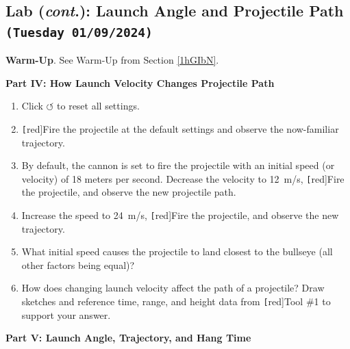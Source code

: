 \documentclass[main-physics.tex]{subfiles}
\begin{document}
\vspace{1em}

\subsection{Lab {\small (\textit{cont}.)}: Launch Angle and Projectile Path \texttt{(Tuesday 01/09/2024)}} \label{9UH4Uj}

\begin{mdframed}[backgroundcolor=csOrange]
    \textbf{Warm-Up}. See Warm-Up from Section \ref{1hGIbN}.
\end{mdframed}

\textbf{Part IV: How Launch Velocity Changes Projectile Path}

\begin{enumerate}
    \item Click $\boldsymbol{\circlearrowleft}$ to reset all settings.
    \item \texttt[red]{Fire} the projectile at the default settings and observe the now-familiar trajectory. 
    \item By default, the cannon is set to fire the projectile with an initial speed (or velocity) of 18 meters per second. Decrease the velocity to \SI{12}{m/s}, \texttt[red]{Fire} the projectile, and observe the new projectile path.
    \item Increase the speed to \SI{24}{m/s}, \texttt[red]{Fire} the projectile, and observe the new trajectory.
    \item What initial speed causes the projectile to land closest to the bullseye (all other factors being equal)?
    \item How does changing launch velocity affect the path of a projectile? Draw sketches and reference time, range, and height data from \texttt[red]{Tool \#1} to support your answer.
\end{enumerate}

\vspace{1em}

\clearpage

\textbf{Part V: Launch Angle, Trajectory, and Hang Time}
\end{document}

